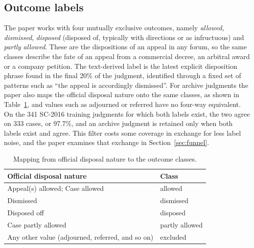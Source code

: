 \documentclass[journal]{IEEEtran}
\newcommand{\cls}[1]{\emph{#1}}
\begin{document}
\subsection{Outcome labels}
The paper works with four mutually exclusive outcomes, namely \cls{allowed}, \cls{dismissed}, \cls{disposed} (disposed of, typically with directions or as infructuous) and \cls{partly allowed}. These are the dispositions of an appeal in any forum, so the same classes describe the fate of an appeal from a commercial decree, an arbitral award or a company petition. The text-derived label is the latest explicit disposition phrase found in the final 20\% of the judgment, identified through a fixed set of patterns such as ``the appeal is accordingly dismissed''. For archive judgments the paper also maps the official disposal nature onto the same classes, as shown in Table~\ref{tab:map}, and values such as adjourned or referred have no four-way equivalent. On the 341 SC-2016 training judgments for which both labels exist, the two agree on 333 cases, or 97.7\%, and an archive judgment is retained only when both labels exist and agree. This filter costs some coverage in exchange for less label noise, and the paper examines that exchange in Section~\ref{sec:funnel}.

\begin{table}[!t]\centering\footnotesize
\caption{Mapping from official disposal nature to the outcome classes.}\label{tab:map}
\begin{tabular}{ll}\toprule Official disposal nature & Class\\\midrule Appeal(s) allowed; Case allowed & allowed\\ Dismissed & dismissed\\ Disposed off & disposed\\ Case partly allowed & partly allowed\\ Any other value (adjourned, referred, and so on) & excluded\\\bottomrule\end{tabular}
\end{table}
\end{document}
